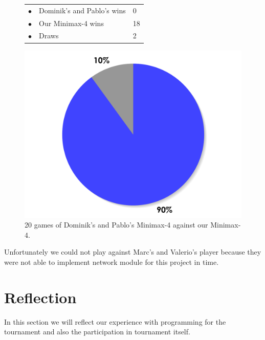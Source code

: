 \documentclass[paper=a4, fontsize=11pt]{article} %
\newcommand{\ra}[1]{\renewcommand{\arraystretch}{#1}}
\begin{document}
\begin{figure}[ht]
    \begin{minipage}[c]{0.40\linewidth}
        \centering
        \ra{1.3}
        \begin{tabular}{cll}
            \toprule
            \textcolor{red!100}{$\bullet$} & Dominik's and Pablo's wins & 0       \\
            \textcolor{blue!100!yellow!100!red!80}{$\bullet$} & Our Minimax-4  wins & 18      \\  
            \textcolor{gray!100}{$\bullet$} & Draws & 2      \\  
            \bottomrule
        \end{tabular}
    \end{minipage}
    \begin{minipage}[c]{0.60\linewidth}
        \centering
        \includegraphics[scale=0.35]{img/tournament.pdf}
    \end{minipage}
    \caption{20 games of Dominik's and Pablo's Minimax-4 against our Minimax-4.}
    \label{fig:tournament}
\end{figure}

Unfortunately we could not play against Marc's and Valerio's player because they were not able to implement network module for this project in time.

\section{Reflection}
In this section we will reflect our experience with programming for the tournament and also the participation in tournament itself.
\end{document}
